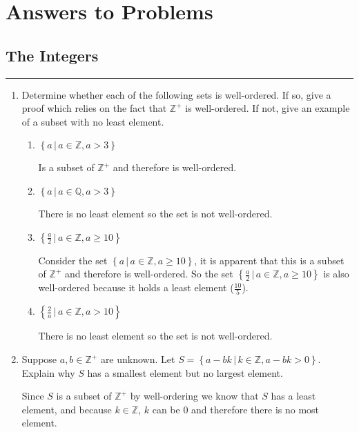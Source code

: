 \documentclass[class=article, crop=false]{standalone}
\def\integers{{\mathbb Z}}
\def\rationals{{\mathbb Q}}
\begin{document}
	
\section{Answers to Problems}

\subsection{The Integers}
\hfill {}
\rule{\textwidth}{1pt}
\begin{enumerate}
\item
  Determine whether each of the following sets is well-ordered.  If
  so, give a proof which relies on the fact that $\integers^+$ is well-ordered.
  If not, give an example of a subset with no least element.\hfill{}
  \begin{enumerate}
  \item
	$\left\{a\,\big|\, a\in\integers,a>3\right\}$

	Is a subset of $\integers^+$ and therefore is well-ordered.
  \item
	$\left\{a\,\big|\, a\in\rationals,a>3\right\}$

	There is no least element so the set is not well-ordered.
  \item
	$\left\{\frac a2\,\big|\, a\in\integers,a\geq 10\right\}$

	Consider the set $\left\{a\,\big|\, a\in\integers,a\geq 10\right\}$, it is apparent that this is a subset of $\integers^+$ and therefore is well-ordered.
	So the set $\left\{\frac a2\,\big|\, a\in\integers,a\geq 10\right\}$ is also well-ordered because it holds a least element ($\frac{10}{5}$).
  \item
	$\left\{\frac 2a\,\big|\, a\in\integers,a>10\right\}$

	There is no least element so the set is not well-ordered.
  \end{enumerate}

\item
  Suppose $a,b\in\integers^+$ are unknown.  Let
  $S=\left\{a-bk\,\big|\, k\in\integers,a-bk>0\right\}$.
  Explain why $S$ has a smallest element but no largest element.\hfill{}

  Since $S$ is a subset of $\integers^+$ by well-ordering we know that $S$ has a least element, and because $k\in\integers$,
  $k$ can be $0$ and therefore there is no most element.


\end{enumerate}
\end{document}
